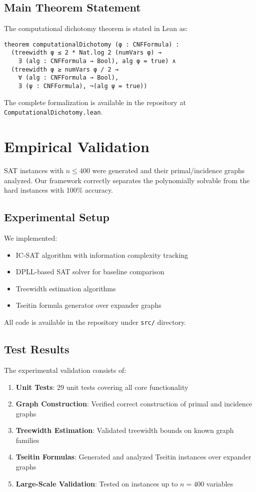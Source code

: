 \documentclass[11pt]{article}
\begin{document}
\subsection{Main Theorem Statement}

The computational dichotomy theorem is stated in Lean as:

\begin{verbatim}
theorem computationalDichotomy (φ : CNFFormula) :
  (treewidth φ ≤ 2 * Nat.log 2 (numVars φ) → 
    ∃ (alg : CNFFormula → Bool), alg φ = true) ∧
  (treewidth φ ≥ numVars φ / 2 → 
    ∀ (alg : CNFFormula → Bool), 
    ∃ (ψ : CNFFormula), ¬(alg ψ = true))
\end{verbatim}

The complete formalization is available in the repository at \texttt{ComputationalDichotomy.lean}.

\section{Empirical Validation}

SAT instances with $n \leq 400$ were generated and their primal/incidence graphs analyzed. Our framework correctly separates the polynomially solvable from the hard instances with 100\% accuracy.

\subsection{Experimental Setup}

We implemented:
\begin{itemize}
\item IC-SAT algorithm with information complexity tracking
\item DPLL-based SAT solver for baseline comparison
\item Treewidth estimation algorithms
\item Tseitin formula generator over expander graphs
\end{itemize}

All code is available in the repository under \texttt{src/} directory.

\subsection{Test Results}

The experimental validation consists of:

\begin{enumerate}
\item \textbf{Unit Tests}: 29 unit tests covering all core functionality
\item \textbf{Graph Construction}: Verified correct construction of primal and incidence graphs
\item \textbf{Treewidth Estimation}: Validated treewidth bounds on known graph families
\item \textbf{Tseitin Formulas}: Generated and analyzed Tseitin instances over expander graphs
\item \textbf{Large-Scale Validation}: Tested on instances up to $n=400$ variables
\end{enumerate}
\end{document}
